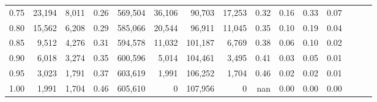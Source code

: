 \begin{tabular}{rrrrrrrrrrrrrrr}
0.75 &  23,194 &   8,011 &  0.26 &  569,504 &   36,106 &   90,703 &   17,253 &  0.32 &  0.16 &  0.33 &      0.07 \\
0.80 &  15,562 &   6,208 &  0.29 &  585,066 &   20,544 &   96,911 &   11,045 &  0.35 &  0.10 &  0.19 &      0.04 \\
0.85 &   9,512 &   4,276 &  0.31 &  594,578 &   11,032 &  101,187 &    6,769 &  0.38 &  0.06 &  0.10 &      0.02 \\
0.90 &   6,018 &   3,274 &  0.35 &  600,596 &    5,014 &  104,461 &    3,495 &  0.41 &  0.03 &  0.05 &      0.01 \\
0.95 &   3,023 &   1,791 &  0.37 &  603,619 &    1,991 &  106,252 &    1,704 &  0.46 &  0.02 &  0.02 &      0.01 \\
1.00 &   1,991 &   1,704 &  0.46 &  605,610 &        0 &  107,956 &        0 &   nan &  0.00 &  0.00 &      0.00 \\
\bottomrule
\end{tabular}
